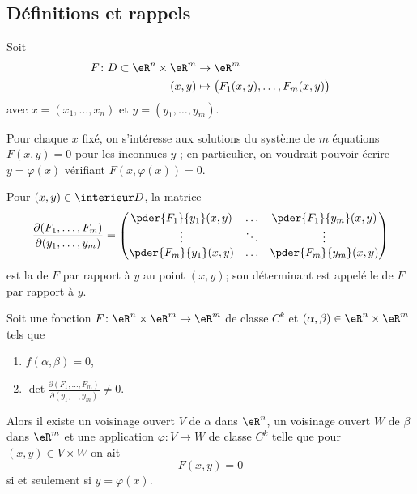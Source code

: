 \subsection{Définitions et rappels}
Soit
\begin{equation}
    \begin{aligned}
        F\colon D\subset \eR^n\times \eR^m&\to \eR^m \\
        (x,y)&\mapsto \big( F_1(x,y),\ldots, F_m(x,y) \big) 
    \end{aligned}
\end{equation}
avec $x = (x_1,\ldots, x_n)$ et $y = (y_1,\ldots,y_m)$.

Pour chaque $x$ fixé, on s'intéresse aux solutions du système de $m$
 équations $F(x,y) = 0$ pour les inconnues $y$ ; en particulier, on
 voudrait pouvoir écrire $y = \varphi(x)$ vérifiant $F(x,\varphi(x)) = 0$.

Pour $(x,y) \in \interieur D$, la matrice
\begin{equation}
    \frac{ \partial (F_1,\ldots, F_m) }{ \partial (y_1,\ldots, y_m) }=
\begin{pmatrix}
\pder {F_1}{y_1}(x,y)& \ldots& \pder {F_1}{y_m}(x,y)\\
\vdots& \ddots & \vdots\\
\pder {F_m}{y_1}(x,y)& \ldots& \pder {F_m}{y_m}(x,y)\\
\end{pmatrix}
\end{equation}
est la  de $F$ par rapport à $y$ au point
$(x,y)$; son déterminant est appelé le  de $F$ par
rapport à $y$.

\begin{theorem}  \label{ThoAcaWho}
    Soit une fonction \( F\colon \eR^n\times \eR^m\to \eR^m\) de classe \( C^k\) et \( (\alpha,\beta)\in \eR^n\times \eR^m\) tels que
    \begin{enumerate}
        \item
            \( f(\alpha,\beta)=0\),
        \item
            $\det\frac{ \partial (F_1,\ldots, F_m) }{ \partial (y_1,\ldots, y_m) }\neq 0$.
    \end{enumerate}
    Alors il existe un voisinage ouvert \( V\) de \( \alpha\) dans \( \eR^n\), un voisinage ouvert \( W\) de \( \beta\) dans \( \eR^m\) et une application \( \varphi\colon V\to W\) de classe \( C^k\)  telle que pour \( (x,y)\in V\times W\) on ait
    \begin{equation}
        F(x,y)=0
    \end{equation}
    si et seulement si \( y=\varphi(x)\).
\end{theorem}
	
